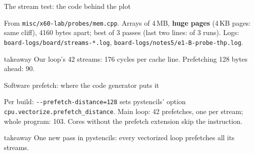 \documentclass[aspectratio=169,10pt,t]{beamer}
\newcommand{\term}[1]{\textcolor{psblue!85!black}{\textbf{#1}}} %
\newcommand{\code}[1]{\texttt{#1}}
\newcommand{\takeaway}[1]{\par\vfill
  \begin{beamercolorbox}[wd=\textwidth,sep=4pt,rounded=true]{takeaway}
    \small #1
  \end{beamercolorbox}}
\begin{document}
\begin{frame}{The stream test: the code behind the plot}
  \vspace{2mm}
  \centering

  \vspace{2mm}
  {\scriptsize\color{psgray}From \code{misc/x60-lab/probes/mem.cpp}. Arrays of 4\,MB, \term{huge pages}
  (4\,KB pages: same cliff), 4160 bytes apart; best of 3 passes (last two lines: of 3 runs). Logs:
  \code{board-logs/board/streams-*.log}, \code{board-logs/notes5/e1-B-probe-thp.log}.\par}
  \takeaway{Our loop's 42 streams: 176 cycles per cache line. Prefetching 128 bytes ahead: 90.}
\end{frame}

\begin{frame}{Software prefetch: where the code generator puts it}
  \vspace{0.5mm}
  \centering

  \vspace{2mm}
  {\scriptsize\color{psgray}Per build: \code{-{}-prefetch-distance=128} sets pystencils' option
  \code{cpu.vectorize.prefetch\_distance}. Main loop: 42 prefetches, one per stream; whole program: 103.
  Cores without the prefetch extension skip the instruction.\par}
  \takeaway{One new pass in pystencils: every vectorized loop prefetches all its streams.}
\end{frame}
\end{document}
